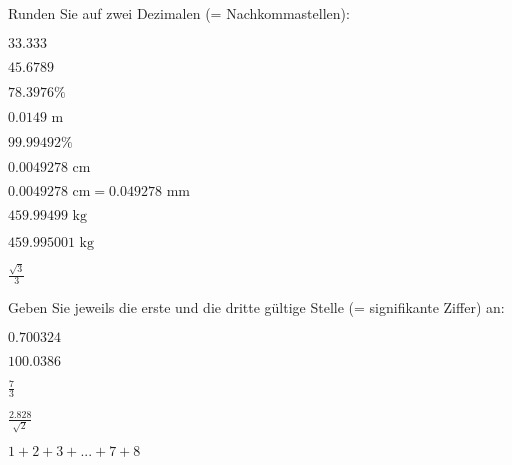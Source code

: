 
\renewcommand{\bbwAufgabenBlockID}{A1rnd}


\usepackage{amssymb} %
\renewcommand{\metaHeaderLine}{Runden}
\renewcommand{\arbeitsblattTitel}{Arbeitsblatt}

\arbeitsblattHeader{}

Runden Sie auf zwei Dezimalen (= Nachkommastellen):
\begin{bbwAufgabenBlock}
\item $33.333$ 
\item $45.6789$ 
\item $78.3976\%$ 
\item $0.0149 \textrm{ m}$ 
\item $99.99492\%$ 
\item $0.0049278 \textrm{ cm}$ 
\item $0.0049278 \textrm{ cm} = 0.049278 \textrm{ mm}$ 
\item $459.99499  \textrm{ kg}$ 
\item $459.995001 \textrm{ kg}$ 
\item $\frac{\sqrt3}{3}$ 
\end{bbwAufgabenBlock}

\platzFuerBerechnungenBisEndeSeite{}



Geben Sie jeweils die erste und die dritte gültige Stelle (=
signifikante Ziffer) an:

\begin{bbwAufgabenBlock}
\item $0.700324$ 
\item $100.0386$ 
\item $\frac73$ 
\item $\frac{2.828}{\sqrt{2}}$ 
\item $1+2+3+...+7+8$ 
\end{bbwAufgabenBlock}

